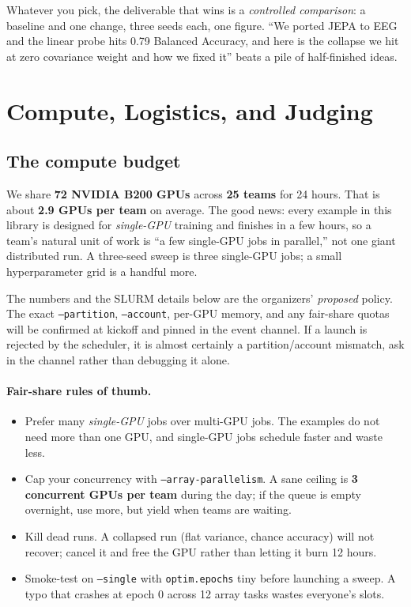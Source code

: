 \documentclass{article}
\newcommand{\code}[1]{\texttt{\small #1}}
\begin{document}
\begin{tipbox}
Whatever you pick, the deliverable that wins is a \emph{controlled comparison}: a
baseline and one change, three seeds each, one figure. ``We ported JEPA to EEG and
the linear probe hits 0.79 Balanced Accuracy, and here is the collapse we hit at
zero covariance weight and how we fixed it'' beats a pile of half-finished ideas.
\end{tipbox}
\section{Compute, Logistics, and Judging}
\label{sec:logistics}

\subsection{The compute budget}

We share \textbf{72 NVIDIA B200 GPUs} across \textbf{25 teams} for 24 hours. That
is about \textbf{2.9 GPUs per team} on average. The good news: every example in
this library is designed for \emph{single-GPU} training and finishes in a few
hours, so a team's natural unit of work is ``a few single-GPU jobs in parallel,''
not one giant distributed run. A three-seed sweep is three single-GPU jobs; a small
hyperparameter grid is a handful more.

\begin{notebox}
The numbers and the SLURM details below are the organizers' \emph{proposed}
policy. The exact \code{--partition}, \code{--account}, per-GPU memory, and any
fair-share quotas will be confirmed at kickoff and pinned in the event channel. If
a launch is rejected by the scheduler, it is almost certainly a partition/account
mismatch, ask in the channel rather than debugging it alone.
\end{notebox}

\paragraph{Fair-share rules of thumb.}
\begin{itemize}[leftmargin=1.4em,itemsep=1pt,topsep=2pt]
  \item Prefer many \emph{single-GPU} jobs over multi-GPU jobs. The examples do not
    need more than one GPU, and single-GPU jobs schedule faster and waste less.
  \item Cap your concurrency with \code{--array-parallelism}. A sane ceiling is
    \textbf{3 concurrent GPUs per team} during the day; if the queue is empty
    overnight, use more, but yield when teams are waiting.
  \item Kill dead runs. A collapsed run (flat variance, chance accuracy) will not
    recover; cancel it and free the GPU rather than letting it burn 12 hours.
  \item Smoke-test on \code{--single} with \code{optim.epochs} tiny before
    launching a sweep. A typo that crashes at epoch 0 across 12 array tasks wastes
    everyone's slots.
\end{itemize}
\end{document}
